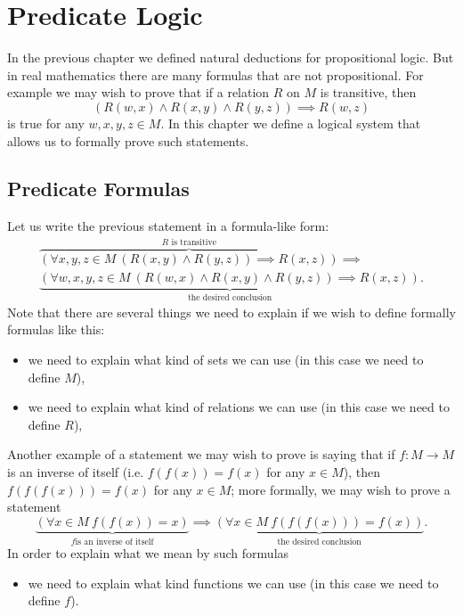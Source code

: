 \chapter{Predicate Logic}
In the previous chapter we defined natural deductions for propositional logic.
But in real mathematics there are many formulas that are not propositional. For
example we may wish to prove that if a relation $R$ on $M$ is transitive, then
\[
  (R(w, x) \land R(x, y) \land R(y, z)) \implies R(w, z)
\]
is true for any $w, x, y, z \in M$. In this chapter we define a logical
system that allows us to formally prove such statements.

\section{Predicate Formulas}
Let us write the previous statement in a formula-like form:
\begin{multline*}
    \overbrace{
        (\forall x, y, z \in M ~ (R(x, y) \land R(y, z)) \implies R(x, z))
    }^{R \text{ is transitive}} \implies \\
    \underbrace{(
        \forall w, x, y, z \in M ~ (R(w, x) \land R(x, y) \land R(y, z))
        \implies
        R(x, z)
    )}_\text{the desired conclusion}.
\end{multline*}
Note that there are several things we need to explain if we wish to define
formally formulas like this:
\begin{itemize}
    \item we need to explain what kind of sets we can use (in this case we need
        to define $M$),
    \item we need to explain what kind of relations we can use (in this case we
        need to define $R$),
\end{itemize}

Another example of a statement we may wish to prove is saying that if
$f : M \to M$ is an inverse of itself (i.e. $f(f(x)) = f(x)$ for any $x \in M$),
then $f(f(f(x))) = f(x)$ for any $x \in M$; more formally, we may wish to prove a
statement
\[
    \underbrace{
        (\forall x \in M ~ f(f(x)) = x)}_{f \text{is an inverse of itself}}
    \implies
    \underbrace{
        (\forall x \in M ~ f(f(f(x))) = f(x))
    }_\text{the desired conclusion}.
\]
In order to explain what we mean by such formulas
\begin{itemize}
  \item we need to explain what kind functions we can use (in this case we need
    to define $f$).
\end{itemize}

